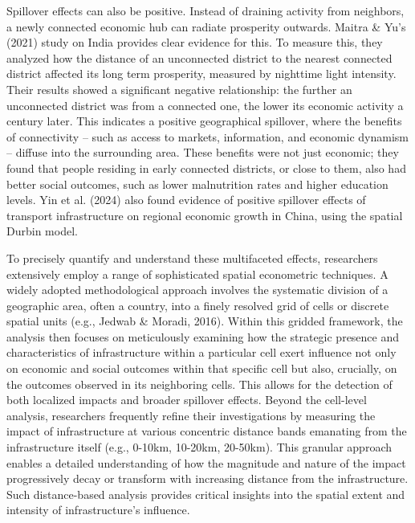 \documentclass[12pt, a4paper]{article}
\begin{document}
Spillover effects can also be positive. Instead of draining activity from neighbors, a newly connected economic hub can radiate prosperity outwards. Maitra \& Yu's (2021) study on India provides clear evidence for this. To measure this, they analyzed how the distance of an unconnected district to the nearest connected district affected its long term prosperity, measured by nighttime light intensity. Their results showed a significant negative relationship: the further an unconnected district was from a connected one, the lower its economic activity a century later. This indicates a positive geographical spillover, where the benefits of connectivity – such as access to markets, information, and economic dynamism – diffuse into the surrounding area. These benefits were not just economic; they found that people residing in early connected districts, or close to them, also had better social outcomes, such as lower malnutrition rates and higher education levels. Yin et al. (2024) also found evidence of positive spillover effects of transport infrastructure on regional economic growth in China, using the spatial Durbin model.

To precisely quantify and understand these multifaceted effects, researchers extensively employ a range of sophisticated spatial econometric techniques. A widely adopted methodological approach involves the systematic division of a geographic area, often a country, into a finely resolved grid of cells or discrete spatial units (e.g., Jedwab \& Moradi, 2016). Within this gridded framework, the analysis then focuses on meticulously examining how the strategic presence and characteristics of infrastructure within a particular cell exert influence not only on economic and social outcomes within that specific cell but also, crucially, on the outcomes observed in its neighboring cells. This allows for the detection of both localized impacts and broader spillover effects. Beyond the cell-level analysis, researchers frequently refine their investigations by measuring the impact of infrastructure at various concentric distance bands emanating from the infrastructure itself (e.g., 0-10km, 10-20km, 20-50km). This granular approach enables a detailed understanding of how the magnitude and nature of the impact progressively decay or transform with increasing distance from the infrastructure. Such distance-based analysis provides critical insights into the spatial extent and intensity of infrastructure's influence.
\end{document}
